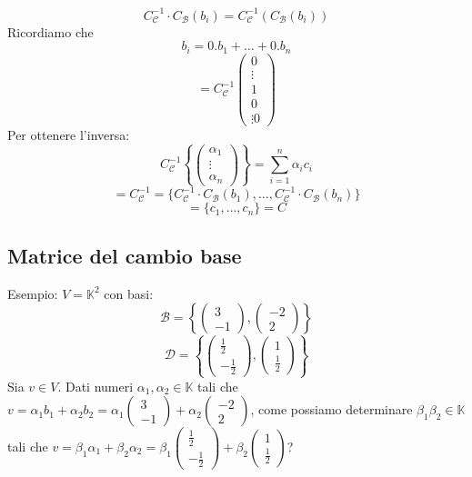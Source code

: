 \documentclass[12pt]{article}
\begin{document}
\[C_{\mathcal{C}}^{-1} \cdot C_{\mathcal{B}}(b_i) = C_{\mathcal{C}}^{-1}( C_{\mathcal{B}}(b_i))\]
Ricordiamo che
\[b_i = 0.b_1 + \dots + 0.b_n\]
\[= C_{\mathcal{C}}^{-1}\begin{pmatrix}
    0\\
    \vdots\\
    1\\
    0\\
    \vdots
    0
\end{pmatrix}\]
Per ottenere l'inversa:
\[C_{\mathcal{C}}^{-1}\left\{\begin{pmatrix}
    \alpha_1\\
    \vdots\\
    \alpha_n
\end{pmatrix}\right\} = \sum^n_{i = 1} \alpha_ic_i\]
\[= C_{\mathcal{C}}^{-1} = \{C_{\mathcal{C}}^{-1} \cdot C_{\mathcal{B}}(b_1), \dots, C_{\mathcal{C}}^{-1} \cdot C_{\mathcal{B}}(b_n)\}\]
\[= \{c_1, \dots, c_n\} = C\]

\subsection{Matrice del cambio base}

Esempio: $V = \mathbb{K}^2$ con basi:
\[\mathcal{B} = \left\{\begin{pmatrix}
    3\\
    -1
\end{pmatrix}, \begin{pmatrix}
    -2\\
    2
\end{pmatrix}\right\}\]
\[\mathcal{D} = \left\{\begin{pmatrix}
    \frac{1}{2}\\
    -\frac{1}{2}
\end{pmatrix}, \begin{pmatrix}
    1\\
    \frac{1}{2}
\end{pmatrix}\right\}\]
Sia $v \in V$. Dati numeri $\alpha_1, \alpha_2 \in \mathbb{K}$ tali che $v = \alpha_1b_1 + \alpha_2b_2 = \alpha_1 \begin{pmatrix}
    3\\
    -1
\end{pmatrix} + \alpha_2 \begin{pmatrix}
    -2\\
    2
\end{pmatrix}$, come possiamo determinare $\beta_1\beta_2 \in \mathbb{K}$ tali che $v = \beta_1\alpha_1 + \beta_2\alpha_2 = \beta_1 \begin{pmatrix}
    \frac{1}{2}\\
    -\frac{1}{2}
\end{pmatrix} + \beta_2 \begin{pmatrix}
    1\\
    \frac{1}{2}
\end{pmatrix}$?
\end{document}

